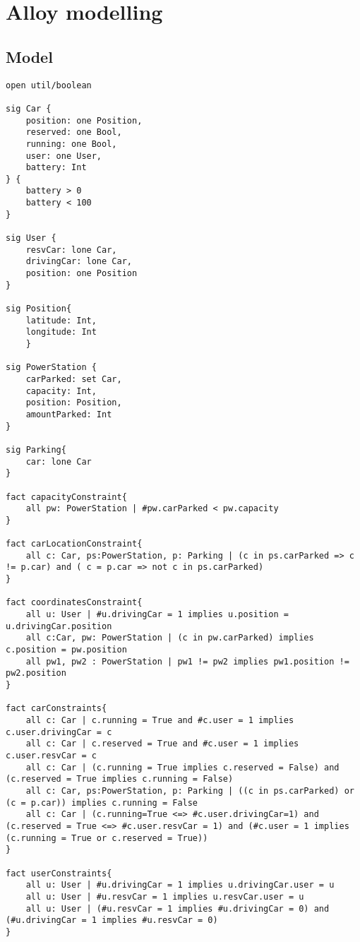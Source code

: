 \chapter{Alloy modelling}

\section{Model}
\begin{verbatim}
open util/boolean

sig Car {
	position: one Position,
	reserved: one Bool,
	running: one Bool,
	user: one User,
	battery: Int
} {
	battery > 0
	battery < 100
}

sig User {
	resvCar: lone Car,
	drivingCar: lone Car,
	position: one Position
}

sig Position{
	latitude: Int,
	longitude: Int
	}

sig PowerStation {
	carParked: set Car,
	capacity: Int,
	position: Position,
	amountParked: Int
}

sig Parking{
	car: lone Car
}

fact capacityConstraint{
	all pw: PowerStation | #pw.carParked < pw.capacity
}

fact carLocationConstraint{
	all c: Car, ps:PowerStation, p: Parking | (c in ps.carParked => c != p.car) and ( c = p.car => not c in ps.carParked) 
}

fact coordinatesConstraint{
	all u: User | #u.drivingCar = 1 implies u.position = u.drivingCar.position
	all c:Car, pw: PowerStation | (c in pw.carParked) implies c.position = pw.position
	all pw1, pw2 : PowerStation | pw1 != pw2 implies pw1.position != pw2.position
}

fact carConstraints{
	all c: Car | c.running = True and #c.user = 1 implies c.user.drivingCar = c
	all c: Car | c.reserved = True and #c.user = 1 implies c.user.resvCar = c
	all c: Car | (c.running = True implies c.reserved = False) and (c.reserved = True implies c.running = False) 
	all c: Car, ps:PowerStation, p: Parking | ((c in ps.carParked) or (c = p.car)) implies c.running = False 
	all c: Car | (c.running=True <=> #c.user.drivingCar=1) and (c.reserved = True <=> #c.user.resvCar = 1) and (#c.user = 1 implies (c.running = True or c.reserved = True))
}

fact userConstraints{
	all u: User | #u.drivingCar = 1 implies u.drivingCar.user = u
	all u: User | #u.resvCar = 1 implies u.resvCar.user = u
	all u: User | (#u.resvCar = 1 implies #u.drivingCar = 0) and (#u.drivingCar = 1 implies #u.resvCar = 0)
}


\end{verbatim}
